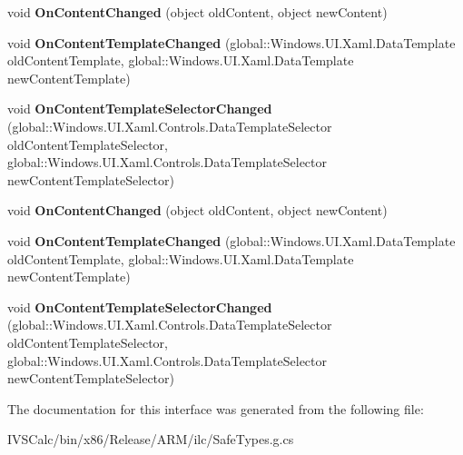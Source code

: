 \begin{DoxyCompactItemize}
\item 
\mbox{\label{interface_windows_1_1_u_i_1_1_xaml_1_1_controls_1_1_i_content_control_overrides_a927b9318fd0f295313825c3e746af39d}} 
void {\bfseries On\+Content\+Changed} (object old\+Content, object new\+Content)
\item 
\mbox{\label{interface_windows_1_1_u_i_1_1_xaml_1_1_controls_1_1_i_content_control_overrides_aa589bdda994fa42b1307791c8667e26e}} 
void {\bfseries On\+Content\+Template\+Changed} (global\+::\+Windows.\+U\+I.\+Xaml.\+Data\+Template old\+Content\+Template, global\+::\+Windows.\+U\+I.\+Xaml.\+Data\+Template new\+Content\+Template)
\item 
\mbox{\label{interface_windows_1_1_u_i_1_1_xaml_1_1_controls_1_1_i_content_control_overrides_a5d05f634bc0c8579985bd7fff3790923}} 
void {\bfseries On\+Content\+Template\+Selector\+Changed} (global\+::\+Windows.\+U\+I.\+Xaml.\+Controls.\+Data\+Template\+Selector old\+Content\+Template\+Selector, global\+::\+Windows.\+U\+I.\+Xaml.\+Controls.\+Data\+Template\+Selector new\+Content\+Template\+Selector)
\item 
\mbox{\label{interface_windows_1_1_u_i_1_1_xaml_1_1_controls_1_1_i_content_control_overrides_a927b9318fd0f295313825c3e746af39d}} 
void {\bfseries On\+Content\+Changed} (object old\+Content, object new\+Content)
\item 
\mbox{\label{interface_windows_1_1_u_i_1_1_xaml_1_1_controls_1_1_i_content_control_overrides_aa589bdda994fa42b1307791c8667e26e}} 
void {\bfseries On\+Content\+Template\+Changed} (global\+::\+Windows.\+U\+I.\+Xaml.\+Data\+Template old\+Content\+Template, global\+::\+Windows.\+U\+I.\+Xaml.\+Data\+Template new\+Content\+Template)
\item 
\mbox{\label{interface_windows_1_1_u_i_1_1_xaml_1_1_controls_1_1_i_content_control_overrides_a5d05f634bc0c8579985bd7fff3790923}} 
void {\bfseries On\+Content\+Template\+Selector\+Changed} (global\+::\+Windows.\+U\+I.\+Xaml.\+Controls.\+Data\+Template\+Selector old\+Content\+Template\+Selector, global\+::\+Windows.\+U\+I.\+Xaml.\+Controls.\+Data\+Template\+Selector new\+Content\+Template\+Selector)
\end{DoxyCompactItemize}


The documentation for this interface was generated from the following file\+:\begin{DoxyCompactItemize}
\item 
I\+V\+S\+Calc/bin/x86/\+Release/\+A\+R\+M/ilc/Safe\+Types.\+g.\+cs\end{DoxyCompactItemize}
